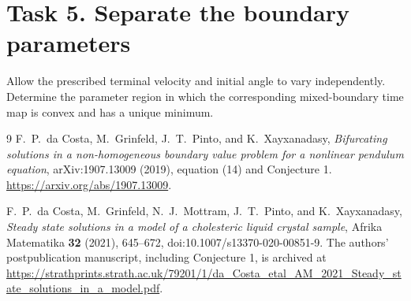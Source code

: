 \documentclass[11pt]{article}
\begin{document}
\section*{Task 5. Separate the boundary parameters}
Allow the prescribed terminal velocity and initial angle to vary
independently. Determine the parameter region in which the corresponding
mixed-boundary time map is convex and has a unique minimum.

\begin{thebibliography}{9}
F.\ P.\ da Costa, M.\ Grinfeld, J.\ T.\ Pinto, and K.\ Xayxanadasy,
\emph{Bifurcating solutions in a non-homogeneous boundary value problem
for a nonlinear pendulum equation}, arXiv:1907.13009 (2019),
equation (14) and Conjecture 1.
\url{https://arxiv.org/abs/1907.13009}.

F.\ P.\ da Costa, M.\ Grinfeld, N.\ J.\ Mottram, J.\ T.\ Pinto, and
K.\ Xayxanadasy,
\emph{Steady state solutions in a model of a cholesteric liquid crystal
sample}, Afrika Matematika \textbf{32} (2021), 645--672,
doi:10.1007/s13370-020-00851-9.
The authors' postpublication manuscript, including Conjecture 1,
is archived at
\url{https://strathprints.strath.ac.uk/79201/1/da_Costa_etal_AM_2021_Steady_state_solutions_in_a_model.pdf}.
\end{thebibliography}
\end{document}
